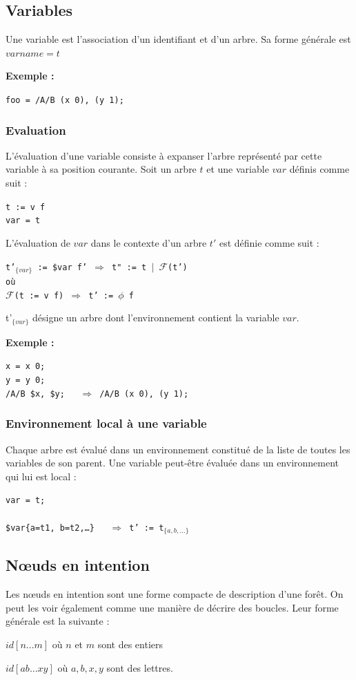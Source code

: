 \documentclass{article}
\newcommand{\exemple}	{\vspace*{1mm}\hspace*{-4mm}\textbf{Exemple :}}
\newcommand{\code}	[2][0.9]		{\vspace{0mm}\begin{center}\colorbox{mygrey}{
							\begin{minipage}[t]{#1\columnwidth} 
							{\small \texttt{#2}}
							\end{minipage}}\end{center}}
\newcommand{\op}	[1]		{\vspace{0mm}\begin{center}\colorbox{mygrey}{
							\begin{minipage}[t]{0.9\columnwidth} 
							{\small \texttt{#1}}
							\end{minipage}}\end{center}}
\newcommand{\seq}		{\ensuremath{|}}
\newcommand{\foret}		{\ensuremath{\phi}}
\newcommand{\toforet}	{\ensuremath{\mathcal{F}}}
\newcommand{\etc}		{…}
\begin{document}
\subsection{Variables}

Une variable est l’association d'un identifiant et d’un arbre. Sa forme générale est 
$varname = t$

\exemple
\code{foo = /A/B (x 0), (y 1); }

\subsubsection{Evaluation}

L'évaluation d'une variable consiste à expanser l'arbre représenté par cette variable à sa position courante.
Soit un arbre $t$ et une variable $var$ définis comme suit :
\op{t :=  v f\\
var = t
}
L'évaluation de $var$ dans le contexte d'un arbre $t'$ est définie comme suit :
\op{t'$_{\{var\}}$ :=  \$var f' $\Rightarrow$ t" := t \seq\ \toforet(t') \\
où \\
\toforet(t := v f) $\Rightarrow$ t' := \foret\ f
}
t'$_{\{var\}}$ désigne un arbre dont l'environnement contient la variable $var$.


\exemple
\code{x = x 0;\\
y = y 0;\\
/A/B \$x, \$y; \ \ $\Rightarrow$  /A/B (x 0), (y 1);}


\subsubsection{Environnement local à une variable}

Chaque arbre est évalué dans un environnement constitué de la liste de toutes les variables de son parent. Une variable peut-être évaluée dans un environnement qui lui est local :
\code{var = t;\\
\\
\$var\{a=t1, b=t2,\etc\} \ \ $\Rightarrow$  t' := t$_{\{a, b,\etc\}}$}


\subsection{Nœuds en intention}

Les nœuds en intention sont une forme compacte de description d'une forêt. On peut les voir également comme une manière de décrire des boucles. Leur forme générale est la suivante :
\begin{description}
\item $id[n…m]$ 	où $n$ et $m$ sont des entiers
\item $id[ab…xy]$ où $a,b,x,y$ sont des lettres.
\end{description}
\end{document}
